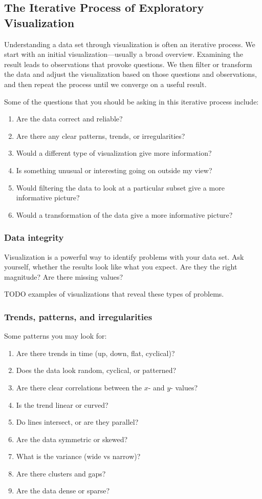 \subsection*{The Iterative Process of Exploratory Visualization} 

Understanding a data set through visualization is often an iterative process. We start with an initial visualization---usually a broad overview.  Examining the result leads to observations that provoke questions.  We then filter or transform the data and adjust the visualization based on those questions and observations, and then repeat the process until we converge on a useful result.

Some of the questions that you should be asking in this iterative process include:
\begin{enumerate}
\item Are the data correct and reliable? 
\item Are there any clear patterns, trends, or irregularities?
\item Would a different type of visualization give more information?
\item Is something unusual or interesting going on outside my view?
\item Would filtering the data to look at a particular subset give a more informative picture?
\item Would a transformation of the data give a more informative picture?
\end{enumerate}

\subsubsection*{Data integrity}

Visualization is a powerful way to identify problems with your data set.  Ask yourself, whether the results look like what you expect.  Are they the right magnitude? Are there missing values? 

TODO examples of visualizations that reveal these types of problems.

\subsubsection*{Trends, patterns, and irregularities}


Some patterns you may look for:
\begin{enumerate}
\item Are there trends in time (up, down, flat, cyclical)?
\item Does the data look random, cyclical, or patterned?
\item Are there clear correlations between the $x$- and $y$- values? 
\item Is the trend linear or curved?
\item Do lines intersect, or are they parallel?
\item Are the data symmetric or skewed?
\item What is the variance (wide vs narrow)?
\item Are there clusters and gaps?
\item Are the data dense or sparse?
\end{enumerate}

